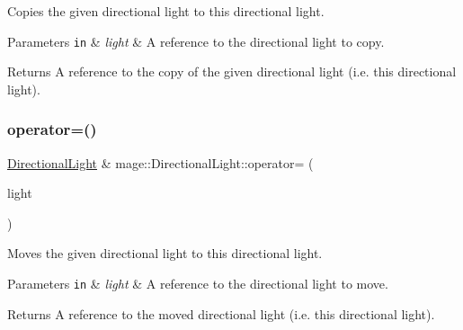 Copies the given directional light to this directional light.


\begin{DoxyParams}[1]{Parameters}
\mbox{\tt in}  & {\em light} & A reference to the directional light to copy. \\
\hline
\end{DoxyParams}
\begin{DoxyReturn}{Returns}
A reference to the copy of the given directional light (i.\+e. this directional light). 
\end{DoxyReturn}
\hypertarget{classmage_1_1_directional_light_a508b595bf6aa5fc9db53e0a854fda41d}{}\label{classmage_1_1_directional_light_a508b595bf6aa5fc9db53e0a854fda41d} 
\subsubsection{\texorpdfstring{operator=()}{operator=()}\hspace{0.1cm}{\footnotesize\ttfamily [2/2]}}
{\footnotesize\ttfamily \hyperlink{classmage_1_1_directional_light}{Directional\+Light} \& mage\+::\+Directional\+Light\+::operator= (\begin{DoxyParamCaption}\item[{\hyperlink{classmage_1_1_directional_light}{Directional\+Light} \&\&}]{light }\end{DoxyParamCaption})\hspace{0.3cm}{\ttfamily [default]}}

Moves the given directional light to this directional light.


\begin{DoxyParams}[1]{Parameters}
\mbox{\tt in}  & {\em light} & A reference to the directional light to move. \\
\hline
\end{DoxyParams}
\begin{DoxyReturn}{Returns}
A reference to the moved directional light (i.\+e. this directional light). 
\end{DoxyReturn}

